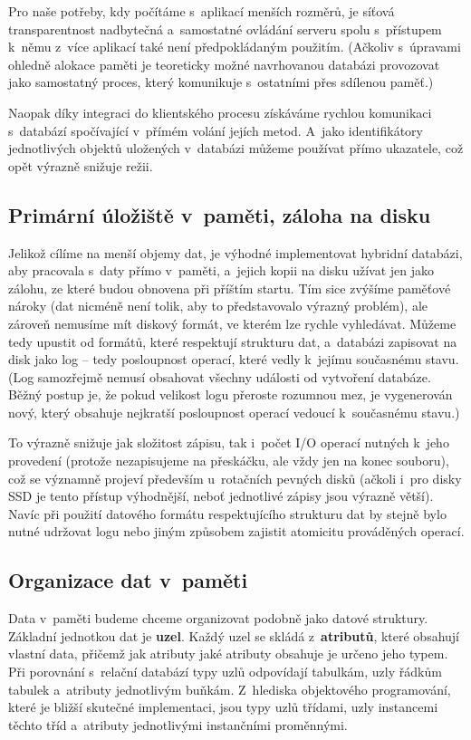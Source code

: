 Pro naše potřeby, kdy počítáme s~aplikací menších rozměrů, je síťová
transparentnost nadbytečná a~samostatné ovládání serveru spolu s~přístupem
k~němu z~více aplikací také není předpokládaným použitím. (Ačkoliv
s~úpravami ohledně alokace paměti je teoreticky možné navrhovanou
databázi provozovat jako samostatný proces, který komunikuje s~ostatními
přes sdílenou paměť.)

Naopak díky integraci do klientského procesu získáváme rychlou komunikaci
s~databází spočívající v~přímém volání jejích metod. A~jako
identifikátory jednotlivých objektů uložených v~databázi můžeme používat přímo
ukazatele, což opět výrazně snižuje režii.

\subsection{Primární úložiště v~paměti, záloha na disku}
Jelikož cílíme na menší objemy dat, je výhodné implementovat hybridní
databázi, aby pracovala s~daty přímo v~paměti, a~jejich kopii na disku užívat
jen jako zálohu,
ze které budou obnovena při příštím startu. Tím sice zvýšíme paměťové
nároky (dat nicméně není tolik, aby to představovalo výrazný problém), ale
zároveň nemusíme mít diskový formát, ve kterém lze rychle vyhledávat.
Můžeme tedy upustit od formátů, které respektují strukturu dat,
a~databázi zapisovat na disk jako log -- tedy posloupnost operací, které
vedly k~jejímu současnému stavu.
(Log samozřejmě nemusí obsahovat všechny události od vytvoření databáze. Běžný
postup je, že pokud velikost logu přeroste rozumnou mez, je vygenerován nový,
který obsahuje nejkratší posloupnost operací vedoucí k~současnému stavu.)

To výrazně snižuje jak složitost
zápisu, tak i~počet I/O operací nutných k~jeho provedení (protože
nezapisujeme na přeskáčku, ale vždy jen na konec souboru), což
se významně projeví především u~rotačních pevných disků (ačkoli i~pro
disky SSD je tento přístup výhodnější, neboť jednotlivé zápisy jsou výrazně
větší). Navíc při použití datového formátu respektujícího strukturu dat
by stejně bylo nutné udržovat logu nebo jiným způsobem zajistit atomicitu
prováděných operací.

\subsection{Organizace dat v~paměti}
Data v~paměti budeme chceme organizovat podobně jako datové struktury. Základní
jednotkou dat je {\bf uzel}. Každý uzel se skládá z~{\bf atributů}, které obsahují
vlastní data, přičemž jak atributy jaké atributy obsahuje je určeno jeho typem.
Při porovnání s~relační databází typy uzlů odpovídají tabulkám, uzly řádkům tabulek
a~atributy jednotlivým buňkám. Z~hlediska objektového programování, které je bližší
skutečné implementaci, jsou typy uzlů třídami, uzly instancemi těchto
tříd a~atributy jednotlivými instančními proměnnými.

